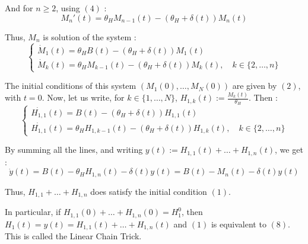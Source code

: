 \documentclass[12pt,a4paper,onecolumn]{article}
\begin{document}
And for $n \geq 2$, using $(4)$  :
\[
M_n'(t) = \theta_H M_{n-1}(t) - (\theta_H + \delta(t)) M_n(t)
\]

Thus, \(M_n\) is solution of the system :
\begin{equation}
\begin{cases}
\dot{M}_1(t) = \theta_H B(t) - (\theta_H + \delta(t)) M_1(t) \\
\dot{M}_k(t) = \theta_H M_{k-1}(t) - (\theta_H + \delta(t)) M_k(t), \quad k \in \{2, \dots, n\}
\end{cases}
\end{equation}

The initial conditions of this system  $(M_1(0), \dots, M_N(0))$ are given by $(2)$, with $t = 0$.
Now, let us write, for \(k \in \{1, \dots, N\}\), $H_{1,k}(t) := \frac{M_k(t)}{\theta_H}$. Then : 
\begin{equation}
\begin{cases}
\dot{H_{1,1}}(t) = B(t) - (\theta_H + \delta(t)) H_{1,1}(t) \\
\dot{H_{1,1}}(t) = \theta_H H_{1, k-1}(t) - (\theta_H + \delta(t)) H_{1,k}(t), \quad k \in \{2, \dots, n\}
\end{cases}
\end{equation}

By summing all the lines, and writing $y(t) := H_{1,1}(t) + \dots + H_{1,n}(t)$, we get :
\[
\dot{y}(t) = B(t) - \theta_H H_{1,n}(t) - \delta(t) y(t) = B(t) - M_n(t) - \delta(t) y(t)
\]

Thus, $H_{1,1} + \dots + H_{1,n}$ does satisfy the initial condition $(1)$.

In particular, if $H_{1,1}(0) + \dots + H_{1,n}(0) =  H_1^0$, then $H_1(t) = y(t) = H_{1,1}(t) + \dots + H_{1,n}(t)$ and $(1)$ is equivalent to $(8)$. This is called the Linear Chain Trick.
\end{document}
